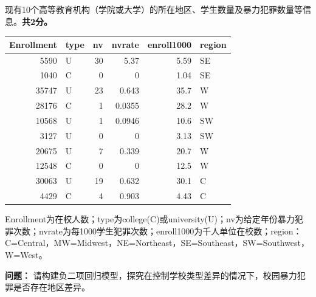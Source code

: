 \par\addvspace{8pt}\noindent\begin{minipage}{\linewidth}


现有10个高等教育机构（学院或大学）的所在地区、学生数量及暴力犯罪数量等信息。\textbf{共2分。}

\begin{center}\small\setlength{\tabcolsep}{4pt}\renewcommand{\arraystretch}{1.22}\begin{tabular}{@{}rlrrrl@{}}
\toprule
Enrollment & type & nv & nvrate & enroll1000 & region \\
\midrule

5590 & U & 30 & 5.37 & 5.59 & SE \\
1040 & C & 0 & 0 & 1.04 & SE \\
35747 & U & 23 & 0.643 & 35.7 & W \\
28176 & C & 1 & 0.0355 & 28.2 & W \\
10568 & U & 1 & 0.0946 & 10.6 & SW \\
3127 & U & 0 & 0 & 3.13 & SW \\
20675 & U & 7 & 0.339 & 20.7 & W \\
12548 & C & 0 & 0 & 12.5 & W \\
30063 & U & 19 & 0.632 & 30.1 & C \\
4429 & C & 4 & 0.903 & 4.43 & C \\
\bottomrule\end{tabular}\end{center}

Enrollment为在校人数；type为college(C)或university(U)；nv为给定年份暴力犯罪次数；nvrate为每1000学生犯罪次数；enroll1000为千人单位在校数；region：C=Central，MW=Midwest，NE=Northeast，SE=Southeast，SW=Southwest，W=West。

\textbf{问题：} 请构建负二项回归模型，探究在控制学校类型差异的情况下，校园暴力犯罪是否存在地区差异。



\end{minipage}\par\vspace{5pt}

